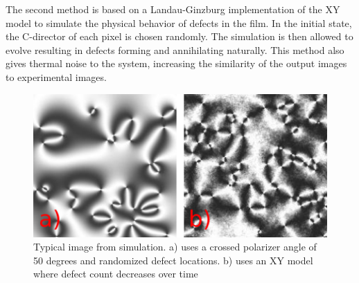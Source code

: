 \documentclass[prl,reprint,showpacs,floatfix,nofootinbib]{revtex4-1}
\begin{document}
The second method is based on a Landau-Ginzburg implementation of the XY model\cite{jelic_quench_2011} to simulate the physical behavior of defects in the film. In the initial state, the C-director of each pixel is chosen randomly. The simulation is then allowed to evolve resulting in defects forming and annihilating naturally. This method also gives thermal noise to the system, increasing the similarity of the output images to experimental images.

\begin{figure}
  \includegraphics[width=\linewidth]{simulations.png}
  \caption{Typical image from simulation. a) uses a crossed polarizer angle of 50 degrees and randomized defect locations. b) uses an XY model where defect count decreases over time}
  \label{fig:RandomDefect}
\end{figure}

%


\end{document}
